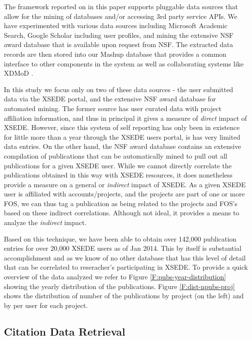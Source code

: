 \documentclass{sig-alternate}
\begin{document}
The framework reported on in this paper supports pluggable data sources that allow for the mining of databases and/or accessing 3rd party service APIs. We have experimented with various data sources including Microsoft Academic Search, Google Scholar including user profiles, and mining the extensive NSF award database that is available upon request from NSF. The extracted data records are then stored into our Mashup database that provides a common interface to other components in the system as well as collaborating systems like XDMoD \cite{CPE:CPE2871}. 
 
In this study we focus only on two of these data sources - the user submitted data via the XSEDE portal, and the extensive NSF award database for automated mining. The former source has user curated data with project affiliation information, and thus in principal it gives a measure of \emph{direct} impact of XSEDE. However, since this system of self reporting has only been in existence for little more than a year through the XSEDE users portal, is has very limited data entries.  On the other hand, the NSF award database contains an extensive compilation of publications that can be automatically mined to pull out all publications for a given XSEDE user.   While we cannot directly correlate the publications obtained in this way with XSEDE resources, it does nonetheless provide a measure on a general or \emph{indirect} impact of XSEDE.   As a given XSEDE user is affiliated with accounts/projects, and the projects are part of one or more FOS, we can thus tag a publication as being related to the projects and FOS's based on these indirect correlations. Although not ideal, it provides a means to analyze the \emph{indirect} impact. 
 
Based on this technique, we have been able to obtain over 142,000 publication entries for over 20,000 XSEDE users as of Jan 2014.  This by itself is substantial accomplishment and as we know of no other database that has this level of detail that can be correlated to reseracher's participating in XSEDE. To provide a quick overview of the data analyzed we refer to Figure \ref{F:pubs-year-distribution} showing the yearly distribution of the publications. Figure \ref{F:dist-npubs-proj} shows the distribution of number of the publications by project (on the left) and by per user for each project. 
 
\subsection{Citation Data Retrieval} 
 
\end{document}
